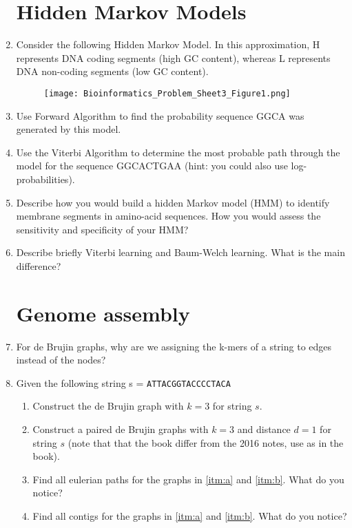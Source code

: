 \documentclass[11pt,runningheads,a4paper]{article}
\newcommand{\DNA}[1]{\texttt{\uppercase{#1}}}
\begin{document}
\begin{enumerate}

\section*{Hidden Markov Models}
\label{sec:hidden_markov_models}

  \item Consider the following Hidden Markov Model. 
    In this approximation, H represents DNA coding segments (high GC content), whereas L represents DNA non-coding segments (low GC content).
    \begin{figure}[H]
      \centering
      \texttt{[image: Bioinformatics\_Problem\_Sheet3\_Figure1.png]}
    \end{figure}
  \item Use Forward Algorithm to find the probability sequence GGCA was generated by this model.
  \item Use the Viterbi Algorithm to determine the most probable path through the model for the sequence GGCACTGAA (hint: you could also use log-probabilities).
  \item Describe how you would build a hidden Markov model (HMM) to identify membrane segments in amino-acid sequences\@. 
    How you would assess the sensitivity and specificity of your HMM?
  \item Describe briefly Viterbi learning and Baum-Welch learning. What is the main difference?
    
\section*{Genome assembly}
\label{sec:genome_assembly}


  \item For de Brujin graphs, why are we assigning the k-mers of a string to edges instead of the nodes?
  \item Given the following string s = \DNA{ATTACGGTACCCCTACA}
    \begin{enumerate}
      \item \label{itm:a} Construct the de Brujin graph with $k=3$ for string $s$.
      \item \label{itm:b} Construct a paired de Brujin graphs with $k=3$ and distance $d=1$ for string $s$ (note that that the book differ from the 2016 notes, use as in the book).
      \item Find all eulerian paths for the graphs in \ref{itm:a} and \ref{itm:b}\@. What do you notice?
      \item Find all contigs for the graphs in \ref{itm:a} and \ref{itm:b}\@. What do you notice?
    \end{enumerate}


\end{enumerate}
\end{document}
